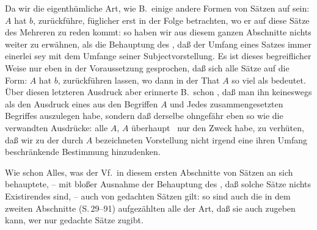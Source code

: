 Da wir die eigenthümliche Art, wie B.\ einige andere Formen von Sätzen auf sein: $A$ hat $b$, zurückführe, füglicher erst in der Folge betrachten, wo er auf diese Sätze des Mehreren zu reden kommt: so haben wir aus diesem ganzen Abschnitte nichts weiter zu erwähnen, als die Behauptung des , daß der Umfang eines Satzes immer einerlei sey mit dem Umfange seiner Subjectvorstellung. Es ist dieses begreiflicher Weise nur eben in der Voraussetzung gesprochen, daß sich alle Sätze auf die Form: $A$ hat $b$, zurückführen lassen, wo dann in der That $A$ so viel als  bedeutet. Über diesen letzteren Ausdruck aber erinnerte B.\ schon , daß man ihn keineswegs als den Ausdruck eines aus den Begriffen $A$ und Jedes zusammengesetzten Begriffes auszulegen habe, sondern daß derselbe ohngefähr eben so wie die verwandten Ausdrücke: alle $A$, $A$ überhaupt \udgl\ nur den Zweck habe, zu verhüten, daß wir zu der durch $A$ bezeichneten Vorstellung nicht irgend eine ihren Umfang beschränkende Bestimmung hinzudenken. \par
\gliederungslinie\par
Wie schon Alles, was der Vf.\ in diesem ersten Abschnitte von Sätzen an sich behauptete, -- mit bloßer Ausnahme der Behauptung des , daß solche Sätze nichts Existirendes sind, -- auch von gedachten Sätzen gilt: so sind auch die in dem zweiten Abschnitte (S.\,29--91) aufgezählten  alle der Art, daß sie auch zugeben kann, wer nur gedachte Sätze zugibt. \par
